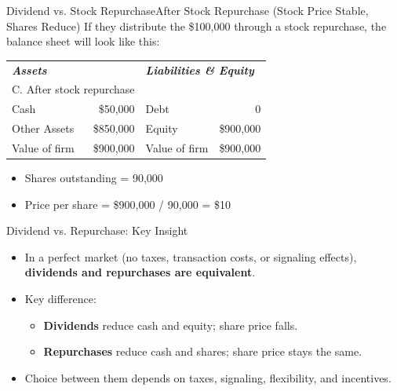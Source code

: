 \begin{frame}{Dividend vs. Stock Repurchase}{After Stock Repurchase (Stock Price Stable, Shares Reduce)}
If they distribute the \$100,000 through a stock repurchase, the balance sheet will look like this:
\begin{table}[]
	\begin{tabular}{@{}lrlr@{}}
		\multicolumn{2}{l}{\textit{\textbf{Assets}}} & \multicolumn{2}{l}{\textit{\textbf{Liabilities   \& Equity}}} \\
		\multicolumn{2}{l}{C.  After stock repurchase} &  & \multicolumn{1}{l}{} \\ \midrule
		Cash & \multicolumn{1}{r|}{\$50,000} & Debt & 0 \\
		Other Assets & \multicolumn{1}{r|}{\$850,000} & Equity & \$900,000 \\
		Value of firm & \multicolumn{1}{r|}{\$900,000} & Value of firm & \$900,000 \\ \bottomrule
	\end{tabular}
\end{table}
\begin{itemize}
	\item Shares outstanding = 90,000
	\item Price per share = \$900,000 / 90,000 = \$10
\end{itemize}
\end{frame}
\begin{frame}{Dividend vs. Repurchase: Key Insight}

\begin{itemize}
    \item In a perfect market (no taxes, transaction costs, or signaling effects), \textbf{dividends and repurchases are equivalent}.
    \item Key difference:
    \begin{itemize}
        \item \textbf{Dividends} reduce cash and equity; share price falls.
        \item \textbf{Repurchases} reduce cash and shares; share price stays the same.
    \end{itemize}
    \item Choice between them depends on taxes, signaling, flexibility, and incentives.
\end{itemize}

\end{frame}

